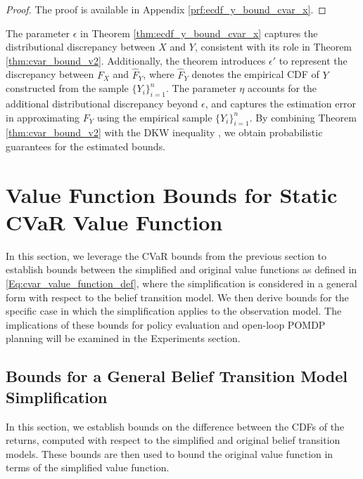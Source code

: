 \documentclass[acmlarge, manuscript, screen, review, natbib=false, oneside]{acmart}
\begin{document}
\begin{proof}
	The proof is available in Appendix \ref{prf:ecdf_y_bound_cvar_x}.
\end{proof}
The parameter $\epsilon$ in Theorem \ref{thm:ecdf_y_bound_cvar_x} captures the distributional discrepancy between $X$ and $Y$, consistent with its role in Theorem \ref{thm:cvar_bound_v2}. Additionally, the theorem introduces $\epsilon'$ to represent the discrepancy between $F_X$ and $\hat{F}_Y$, where $\hat{F}_Y$ denotes the empirical CDF of $Y$ constructed from the sample $\{Y_i\}_{i=1}^n$. The parameter $\eta$ accounts for the additional distributional discrepancy beyond $\epsilon$, and captures the estimation error in approximating $F_Y$ using the empirical sample $\{Y_i\}_{i=1}^n$. By combining Theorem \ref{thm:cvar_bound_v2} with the DKW inequality \cite{DKW_inequality}, we obtain probabilistic guarantees for the estimated bounds.


\section{Value Function Bounds for Static CVaR Value Function}\label{sec:cvar_bounds}
In this section, we leverage the CVaR bounds from the previous section to establish bounds between the simplified and original value functions as defined in \eqref{Eq:cvar_value_function_def}, where the simplification is considered in a general form with respect to the belief transition model. We then derive bounds for the specific case in which the simplification applies to the observation model. The implications of these bounds for policy evaluation and open-loop POMDP planning will be examined in the Experiments section.

\subsection{Bounds for a General Belief Transition Model Simplification}\label{sec:bounds_for_simplified_belief_model}
In this section, we establish bounds on the difference between the CDFs of the returns, computed with respect to the simplified and original belief transition models. These bounds are then used to bound the original value function in terms of the simplified value function.
\end{document}
